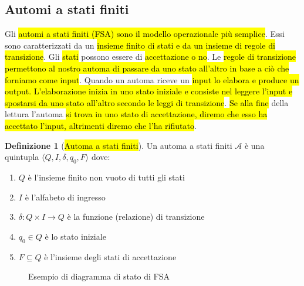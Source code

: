 \documentclass[a4paper,11pt,oneside]{article}
\theoremstyle{plain}
\theoremstyle{definition}
\newtheorem{defn}{Definizione}[section]
\theoremstyle{remark}
\begin{document}
\subsection{Automi a stati finiti}\label{sec:fsa}

Gli \hl{automi a stati finiti (FSA) sono il modello operazionale più semplice}.
Essi sono caratterizzati da un \hl{insieme finito di stati e da un insieme di
regole di transizione}. Gli \hl{stati} possono essere di \hl{accettazione o no}.
Le \hl{regole di transizione permettono al nostro automa di passare da uno stato
all'altro in base a ciò che forniamo come input}. Quando un automa riceve un
\hl{input lo elabora e produce un output. L'elaborazione inizia in uno stato
iniziale e consiste nel leggere l'input e spostarsi da uno stato all'altro
secondo le leggi di transizione}. \hl{Se alla fine} della lettura l'automa
\hl{si trova in uno stato di accettazione, diremo che esso ha accettato l'input,
altrimenti diremo che l'ha rifiutato}.

\begin{defn}[\hl{Automa a stati finiti}]\label{def:fsa}
  Un automa a stati finiti $\mathcal{A}$ è una quintupla
  $\langle Q, I, \delta, q_0, F \rangle$ dove:
  \begin{enumerate}
    \item $Q$ è l'insieme finito non vuoto di tutti gli stati
    \item $I$ è l'alfabeto di ingresso
    \item $\delta: Q \times I \to Q$ è la funzione (relazione) di transizione
    \item $q_0 \in Q$ è lo stato iniziale
    \item $F \subseteq Q$ è l'insieme degli stati di accettazione
  \end{enumerate}
\end{defn}

\begin{figure}[htb]
  \centering
  \caption{Esempio di diagramma di stato di FSA}\label{fig:fsa-diagramma-stato}
\end{figure}
\end{document}
